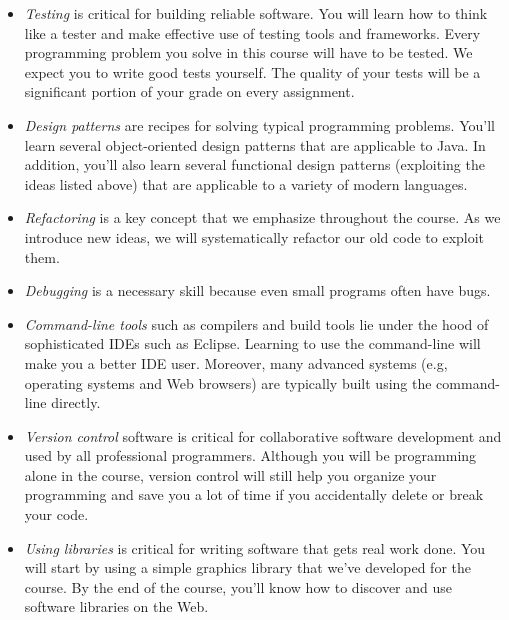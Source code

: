 \documentclass{book}
\begin{document}
\begin{itemize}

\item \emph{Testing} is critical for building reliable software. You will learn how
  to think like a tester and make effective use of testing tools and frameworks.
  Every programming problem you solve in this course will have to be tested. We
  expect you to write good tests yourself. The quality of your tests will be a
  significant portion of your grade on every assignment.

\item \emph{Design patterns} are recipes for solving typical programming
  problems. You'll learn several object-oriented design patterns that are
  applicable to Java. In addition, you'll also learn several functional design
  patterns (exploiting the ideas listed above) that are applicable to a variety
  of modern languages.

\item \emph{Refactoring} is a key concept that we emphasize throughout the
  course. As we introduce new ideas, we will systematically refactor our old
  code to exploit them.

\item \emph{Debugging} is a necessary skill because even small programs often
  have bugs.

\item \emph{Command-line tools} such as compilers and build tools lie under the
  hood of sophisticated IDEs such as Eclipse. Learning to use the command-line
  will make you a better IDE user. Moreover, many advanced systems (e.g,
  operating systems and Web browsers) are typically built using the command-line
  directly.

\item \emph{Version control} software is critical for collaborative software
  development and used by all professional programmers. Although you will be
  programming alone in the course, version control will still help you organize
  your programming and save you a lot of time if you accidentally delete or
  break your code.

\item \emph{Using libraries} is critical for writing software that gets real
  work done. You will start by using a simple graphics library that we've
  developed for the course. By the end of the course, you'll know how to
  discover and use software libraries on the Web.

\end{itemize}
\end{document}
